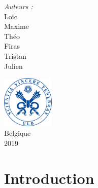 \documentclass[a4paper,11pt]{article}
\begin{document}
\begin{titlepage}
\begin{center}
		\begin{minipage}[t]{0.6\textwidth}
			\begin{center} \large
				\emph{Auteurs :}            \\
				\vspace{2mm}
                Loïc           \\
                Maxime          \\
                Théo           \\
                Firas           \\
                Tristan      \\
                Julien 
			\end{center}
		\end{minipage}
			
		\vfill
			
		\includegraphics[height = 25mm]{sceau.jpg} \\
		\vspace{5mm}
		{\large Belgique \\2019}
	\end{center}
\end{titlepage}
\clearpage

\tableofcontents



\clearpage
{}

\section{Introduction}
\end{document}
